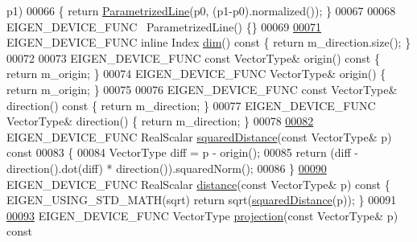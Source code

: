 \begin{DoxyCode}
      p1)
00066   \{ \textcolor{keywordflow}{return} \hyperlink{group___geometry___module_a7c23f36d93cf3b3c2b37fd9f9eda5685}{ParametrizedLine}(p0, (p1-p0).normalized()); \}
00067 
00068   EIGEN\_DEVICE\_FUNC ~ParametrizedLine() \{\}
00069 
\hyperlink{group___geometry___module_a2e8d1ca4d1570e456952b5e979e5171c}{00071}   EIGEN\_DEVICE\_FUNC \textcolor{keyword}{inline} Index \hyperlink{group___geometry___module_a2e8d1ca4d1570e456952b5e979e5171c}{dim}()\textcolor{keyword}{ const }\{ \textcolor{keywordflow}{return} m\_direction.size(); \}
00072 
00073   EIGEN\_DEVICE\_FUNC \textcolor{keyword}{const} VectorType& origin()\textcolor{keyword}{ const }\{ \textcolor{keywordflow}{return} m\_origin; \}
00074   EIGEN\_DEVICE\_FUNC VectorType& origin() \{ \textcolor{keywordflow}{return} m\_origin; \}
00075 
00076   EIGEN\_DEVICE\_FUNC \textcolor{keyword}{const} VectorType& direction()\textcolor{keyword}{ const }\{ \textcolor{keywordflow}{return} m\_direction; \}
00077   EIGEN\_DEVICE\_FUNC VectorType& direction() \{ \textcolor{keywordflow}{return} m\_direction; \}
00078 
\hyperlink{group___geometry___module_a7dc9009fd67184754823cf90ae8f6eae}{00082}   EIGEN\_DEVICE\_FUNC RealScalar \hyperlink{group___geometry___module_a7dc9009fd67184754823cf90ae8f6eae}{squaredDistance}(\textcolor{keyword}{const} VectorType& p)\textcolor{keyword}{ const}
00083 \textcolor{keyword}{  }\{
00084     VectorType diff = p - origin();
00085     \textcolor{keywordflow}{return} (diff - direction().dot(diff) * direction()).squaredNorm();
00086   \}
\hyperlink{group___geometry___module_a1c038c9559f76794369bd2ae74e93b9f}{00090}   EIGEN\_DEVICE\_FUNC RealScalar \hyperlink{group___geometry___module_a1c038c9559f76794369bd2ae74e93b9f}{distance}(\textcolor{keyword}{const} VectorType& p)\textcolor{keyword}{ const }\{ EIGEN\_USING\_STD\_MATH(sqrt) \textcolor{keywordflow}{
      return} sqrt(\hyperlink{group___geometry___module_a7dc9009fd67184754823cf90ae8f6eae}{squaredDistance}(p)); \}
00091 
\hyperlink{group___geometry___module_a3c7a7a3db3d4380c538d55fc8df77f87}{00093}   EIGEN\_DEVICE\_FUNC VectorType \hyperlink{group___geometry___module_a3c7a7a3db3d4380c538d55fc8df77f87}{projection}(\textcolor{keyword}{const} VectorType& p)\textcolor{keyword}{ const}

\end{DoxyCode}
